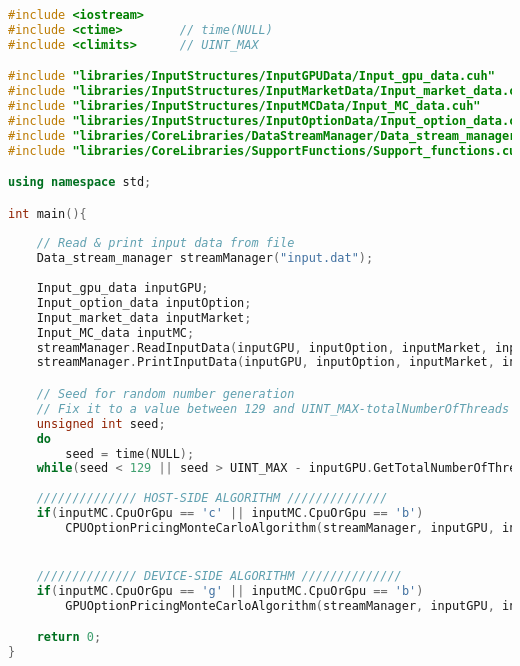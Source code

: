 \begin{lstlisting}[language=C++, caption={\texttt{main.cu}}]
#include <iostream>
#include <ctime>		// time(NULL)
#include <climits>		// UINT_MAX

#include "libraries/InputStructures/InputGPUData/Input_gpu_data.cuh"
#include "libraries/InputStructures/InputMarketData/Input_market_data.cuh"
#include "libraries/InputStructures/InputMCData/Input_MC_data.cuh"
#include "libraries/InputStructures/InputOptionData/Input_option_data.cuh"
#include "libraries/CoreLibraries/DataStreamManager/Data_stream_manager.cuh"
#include "libraries/CoreLibraries/SupportFunctions/Support_functions.cuh"

using namespace std;

int main(){
	
	// Read & print input data from file
	Data_stream_manager streamManager("input.dat");
	
	Input_gpu_data inputGPU;
	Input_option_data inputOption;
	Input_market_data inputMarket;
	Input_MC_data inputMC;
	streamManager.ReadInputData(inputGPU, inputOption, inputMarket, inputMC);
	streamManager.PrintInputData(inputGPU, inputOption, inputMarket, inputMC);

	// Seed for random number generation
	// Fix it to a value between 129 and UINT_MAX-totalNumberOfThreads or let time(NULL) do its magic
	unsigned int seed;	
	do
		seed = time(NULL);
	while(seed < 129 || seed > UINT_MAX - inputGPU.GetTotalNumberOfThreads());	
	
	////////////// HOST-SIDE ALGORITHM //////////////
	if(inputMC.CpuOrGpu == 'c' || inputMC.CpuOrGpu == 'b')
		CPUOptionPricingMonteCarloAlgorithm(streamManager, inputGPU, inputOption, inputMarket, inputMC, seed);


	////////////// DEVICE-SIDE ALGORITHM //////////////
	if(inputMC.CpuOrGpu == 'g' || inputMC.CpuOrGpu == 'b')
		GPUOptionPricingMonteCarloAlgorithm(streamManager, inputGPU, inputOption, inputMarket, inputMC, seed);

	return 0;
}
\end{lstlisting}